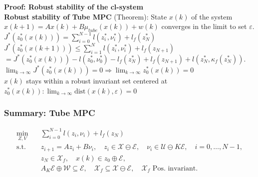 \textbf{Proof: Robust stability of the cl-system}\\
\textbf{Robust stability of Tube MPC} (Theorem): State $x(k)$ of the system $x(k+1)=Ax(k)+B\mu_{tube}(x(k))+w(k)$ \rightarrow converges in the limit to set $\varepsilon$.\\
$J^*(z_0^*(x(k)))=\sum_{i=0}^{N-1}l(z_i^*,\nu_i^*)+l_f(z_N^*)$\\
$J^*(z_0^*(x(k+1)))\leq\sum_{i=1}^Nl(z_i^*,\nu_i^*)+l_f(z_{N+1})$\\
$=J^*(z_0^*(x(k)))-l(z_0^*,\nu_0^*)-l_f(z_N^*)+l_f(z_{N+1})+l(z_N^*,\kappa_f(z_N^*))$.\\
\rightarrow $\lim_{k\rightarrow\infty}J^*(z_0^*(x(k)))=0 \Rightarrow \lim_{k\rightarrow\infty}z_0^*(x(k))=0$\\
\rightarrow $x(k)$ stays within a robust invariant set centered at $z_0^*(x(k)):\lim_{k\rightarrow\infty}\text{dist}(x(k),\varepsilon)=0$

\subsubsection{Summary: Tube MPC}

\begin{tcolorbox}[eqbox]
\begingroup
\setlength{\jot}{1pt}
\[
\begin{aligned}
\min_{Z,V}\quad
& \sum_{i=0}^{N-1} l(z_i,\nu_i)+l_f(z_N)\\[-1mm]
\text{s.t.}\quad
& z_{i+1}=Az_i+B\nu_i,\quad
  z_i\in\mathcal{X}\ominus\mathcal{E},\quad
  \nu_i\in\mathcal{U}\ominus K\mathcal{E},
  \quad i=0,\ldots,N-1,\\
& z_N\in\mathcal{X}_f,\quad
  x(k)\in z_0\oplus\mathcal{E},\\
& A_K\mathcal{E}\oplus\mathcal{W}\subseteq\mathcal{E},\quad
  \mathcal{X}_f\subseteq\mathcal{X}\ominus\mathcal{E},\quad
  \mathcal{X}_f\text{ Pos. invariant}.
\end{aligned}
\]
\endgroup
\end{tcolorbox}

\vspace{0.5em}

